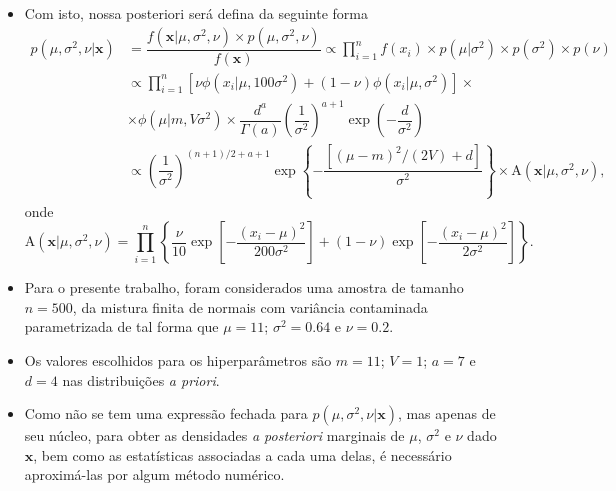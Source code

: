 \documentclass[9pt]{beamer}
\begin{document}
\begin{frame}
\begin{itemize}
\justifying	
\item Com isto, nossa posteriori será defina da seguinte forma
\begin{align} 
p(\mu, \sigma^2, \nu | \mathbf{x})
&= \dfrac{f(\mathbf{x} | \mu, \sigma^2, \nu) \times p(\mu, \sigma^2, \nu)}{f(\mathbf{x})} \propto \prod_{i=1}^{n} f(x_i) \times p(\mu | \sigma^2) \times p(\sigma^2) \times p(\nu) \nonumber\\
&\propto \prod_{i=1}^{n} \left[ \nu \phi(x_i | \mu, 100 \sigma^2) + (1 - \nu) \phi(x_i | \mu, \sigma^2) \right] \times \nonumber \\
&\times \phi(\mu | m, V \sigma^2) \times \dfrac{d^a}{\Gamma(a)} \left(\dfrac{1}{\sigma^2}\right)^{a + 1} \exp\left(-\dfrac{d}{\sigma^2}\right) \nonumber \\	&\propto \left(\dfrac{1}{\sigma^2}\right)^{(n + 1)/2 + a + 1} \exp\left\{-\dfrac{\left[(\mu - m)^2 / (2V) + d\right]}{\sigma^2}\right\} \times \textrm{A}(\mathbf{x} | \mu, \sigma^2, \nu), \label{eq:dist_post}
\end{align}
onde
\begin{equation*}
\textrm{A}(\mathbf{x} | \mu, \sigma^2, \nu) = \prod_{i=1}^{n} \left\{  \dfrac{\nu}{10} \exp\left[-\dfrac{(x_i - \mu)^2}{200\sigma^2}\right] + (1 - \nu) \exp\left[-\dfrac{(x_i - \mu)^2}{2\sigma^2}\right] \right\}.
\end{equation*}
\end{itemize}
\end{frame}
\begin{frame}
\begin{itemize}
\justifying	
\item Para o presente trabalho, foram considerados uma amostra de tamanho $n=500$, da mistura finita de normais com variância contaminada parametrizada de tal forma que $\mu = 11$; $\sigma^2 = 0.64$ e $\nu = 0.2$.
\item Os valores escolhidos para os hiperparâmetros são $m = 11$; $V = 1$; $a = 7$ e $d = 4$ nas distribuições \textit{a priori}.
\item Como não se tem uma expressão fechada para $p(\mu, \sigma^2, \nu | \mathbf{x})$, mas apenas de seu núcleo, para obter as densidades \textit{a posteriori} marginais de $\mu$, $\sigma^2$ e $\nu$ dado $\mathbf{x}$, bem como as estatísticas associadas a cada uma delas, é necessário aproximá-las por algum método numérico.
\end{itemize}
\end{frame}
\end{document}
